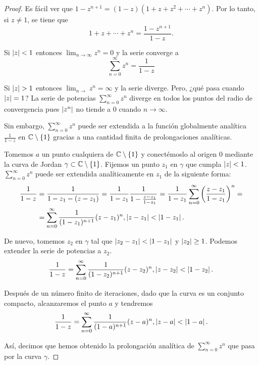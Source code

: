 \begin{proof}
Es fácil ver que $1 - z^{n+1} = (1 - z) (1+ z + z^2 + \cdots + z^n)$. Por lo tanto, si $z \neq 1$, se tiene que
\begin{equation}
    1 + z + \cdots + z^n = \frac{1 - z^{n+1}}{1-z}.
\end{equation}

Si $\left\lvert z\right\rvert < 1$ entonces $\lim_{n \rightarrow \infty} z^n = 0$ y la serie converge a
\begin{equation*}
    \sum_{n=0}^{\infty} z^n = \frac{1}{1 - z}
\end{equation*}

Si $\left\lvert z\right\rvert > 1$ entonces $\lim_{n \rightarrow} z^n = \infty$ y la serie diverge. Pero, ¿qué pasa cuando $\left\lvert z\right\rvert = 1$? La serie de potencias $\sum_{n=0}^{\infty} z^n$ diverge en todos los puntos del radio de convergencia pues $\left\lvert z^n\right\rvert$ no tiende a 0 cuando $n \rightarrow \infty$.

Sin embargo, $\sum_{n=0}^{\infty} z^n$ puede ser extendida a la función globalmente analítica $\frac{1}{1-z}$ en $\mathbb{C} \setminus \{1\}$ gracias a una cantidad finita de prolongaciones analíticas.

Tomemos $a$ un punto cualquiera de $\mathbb{C} \setminus \{1\}$ y conectémoslo al origen $0$ mediante la curva de Jordan $\gamma \subset \mathbb{C} \setminus \{1\}$. Fijemos un punto $z_1$ en $\gamma$ que cumpla $\left\lvert z\right\rvert < 1$. $\sum_{n=0}^{\infty} z^n$ puede ser extendida analíticamente en $z_1$ de la siguiente forma:
\begin{equation*}
    \begin{split}
        \frac{1}{1-z} & = \frac{1}{1 - z_1 - (z - z_1)} = \frac{1}{1 - z_1} \frac{1}{1 - \frac{z - z_1}{1 - z_1}} = \frac{1}{1 - z_1} \sum_{n=0}^{\infty} \left(\frac{z - z_1}{1 - z_1} \right)^n = \\
                      & = \sum_{n=0}^{\infty}  \frac{1}{(1 - z_1)^{n+1}} (z - z_1)^n, \left\lvert z - z_1\right\rvert < \left\lvert1 - z_1\right\rvert.
    \end{split}
\end{equation*}

De nuevo, tomemos $z_2$ en $\gamma$ tal que $\left\lvert z_2 - z_1\right\rvert < \left\lvert1 - z_1\right\rvert$ y $\left\lvert z_2\right\rvert \geq 1$. Podemos extender la serie de potencias a $z_2$.
\begin{equation*}
    \frac{1}{1-z} = \sum_{n=0}^{\infty} \frac{1}{(1 - z_2)^{n+1}} (z - z_2)^n , \left\lvert z - z_2\right\rvert < \left\lvert1 - z_2\right\rvert.
\end{equation*}


Después de un número finito de iteraciones, dado que la curva es un conjunto compacto, alcanzaremos el punto $a$ y tendremos
\begin{equation*}
    \frac{1}{1-z} = \sum_{n=0}^{\infty} \frac{1}{(1 - a)^{n+1}} (z - a)^n , \left\lvert z - a\right\rvert < \left\lvert1 - a\right\rvert.
\end{equation*}

Así, decimos que hemos obtenido la prolongación analítica de $\sum_{n=0}^{\infty} z^n$ que pasa por la curva $\gamma$.
\end{proof}

